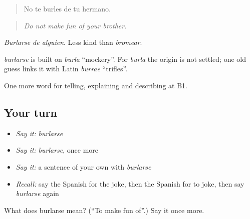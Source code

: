 \begin{quote}
No te burles de tu hermano.
\end{quote}

\begin{quote}
\emph{Do not make fun of your brother.}
\end{quote}

\emph{Burlarse de alguien}. Less kind than \emph{bromear}.

\begin{cousinweb}
\emph{burlarse} is built on \emph{burla} \textquotedblleft{}mockery\textquotedblright{}. For \emph{burla} the origin is not settled; one old guess links it with Latin \emph{burrae} \textquotedblleft{}trifles\textquotedblright{}.
\end{cousinweb}

\begin{grammarlens}[title={What you've built}]
One more word for telling, explaining and describing at B1.
\end{grammarlens}

\subsection*{Your turn}
\begin{itemize}
\raggedright
  \item \emph{Say it:} \emph{burlarse}
  \item \emph{Say it:} \emph{burlarse}, once more
  \item \emph{Say it:} a sentence of your own with \emph{burlarse}
  \item \emph{Recall:} say the Spanish for the joke, then the Spanish for to joke, then say \emph{burlarse} again
\end{itemize}

\begin{tcolorbox}[breakable,colback=teal!4,colframe=teal!35!black,title={Before you move on}]
What does burlarse mean? (\textquotedblleft{}To make fun of\textquotedblright{}.) Say it once more.
\end{tcolorbox}
